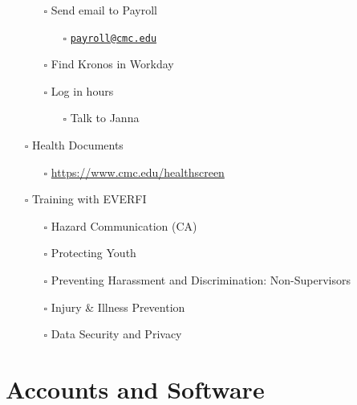 \documentclass[
]{book}
\providecommand{\tightlist}{%
  \setlength{\itemsep}{0pt}\setlength{\parskip}{0pt}}
\begin{document}
\begin{itemize}
  \begin{itemize}
  \tightlist
  \item[$\square$]
    Send email to Payroll

    \begin{itemize}
    \tightlist
    \item[$\square$]
      \href{mailto:payroll@cmc.edu}{\nolinkurl{payroll@cmc.edu}}
    \end{itemize}
  \item[$\square$]
    Find Kronos in Workday
  \item[$\square$]
    Log in hours

    \begin{itemize}
    \tightlist
    \item[$\square$]
      Talk to Janna
    \end{itemize}
  \end{itemize}
\item[$\square$]
  Health Documents

  \begin{itemize}
  \tightlist
  \item[$\square$]
    \url{https://www.cmc.edu/healthscreen}
  \end{itemize}
\item[$\square$]
  Training with EVERFI

  \begin{itemize}
  \tightlist
  \item[$\square$]
    Hazard Communication (CA)
  \item[$\square$]
    Protecting Youth
  \item[$\square$]
    Preventing Harassment and Discrimination: Non-Supervisors
  \item[$\square$]
    Injury \& Illness Prevention
  \item[$\square$]
    Data Security and Privacy
  \end{itemize}
\end{itemize}

\hypertarget{accounts-and-software}{%
\chapter{Accounts and Software}\label{accounts-and-software}}
\end{document}
